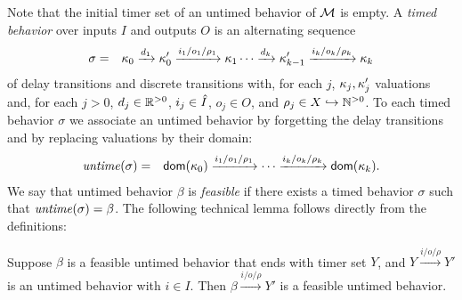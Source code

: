 Note that the initial timer set of an untimed behavior of ${\mathcal M}$ is empty.
%
A \emph{timed behavior} over inputs $I$ and outputs $O$ is an alternating sequence
\begin{eqnarray}
\label{timedbehavior}
\sigma & = & \kappa_0 \xrightarrow{d_1} \kappa'_0 \xrightarrow{i_1/o_1/\rho_1} \kappa_1 \cdots
\xrightarrow{d_k} \kappa'_{k-1} \xrightarrow{i_k/o_k/\rho_k} \kappa_{k}
\end{eqnarray}
of delay transitions and discrete transitions with, for each $j$,
$\kappa_j, \kappa'_j$ valuations and,
for each $j>0$,  $d_j \in {\mathbb R}^{> 0}$, $i_j \in \hat{I}$, $o_j \in O$, and $\rho_j \in X \hookrightarrow {\mathbb N}^{>0}$.
To each timed behavior $\sigma$ we associate an untimed behavior by forgetting the
delay transitions and by replacing valuations by their domain:
\begin{eqnarray*}
\mathit{untime}(\sigma) & = & {\textsf{dom}}(\kappa_0) \xrightarrow{i_1/o_1/\rho_1}  \cdots \xrightarrow{i_k/o_k/\rho_k} {\textsf{dom}}(\kappa_k).
\end{eqnarray*}
We say that untimed behavior $\beta$ is \emph{feasible} if there exists a timed behavior $\sigma$ such that $\mathit{untime}(\sigma) = \beta$.
The following technical lemma follows directly from the definitions:

\begin{lemma}
\label{feasible plus input is feasible}
Suppose $\beta$ is a feasible untimed behavior that ends with timer set $Y$, and 
$Y \xrightarrow{i/o/\rho} Y'$ is an untimed behavior with $i \in I$.
Then $\beta \xrightarrow{i/o/\rho} Y'$ is a feasible untimed behavior.
\end{lemma}

